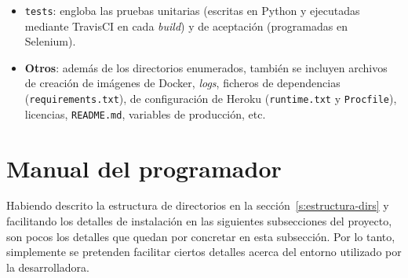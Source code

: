 \begin{itemize}
	\item \texttt{tests}: engloba las pruebas unitarias (escritas en Python y ejecutadas mediante TravisCI en cada \textit{build}) y de aceptación (programadas en Selenium).
	
	\item \textbf{Otros}: además de los directorios enumerados, también se incluyen archivos de creación de imágenes de Docker, \textit{logs}, ficheros de dependencias (\texttt{requirements.txt}), de configuración de Heroku (\texttt{runtime.txt} y \texttt{Procfile}), licencias, \texttt{README.md}, variables de producción, etc.
\end{itemize}



\section{Manual del programador}
\label{s:man-prog}

Habiendo descrito la estructura de directorios en la sección~\ref{s:estructura-dirs} y facilitando los detalles de instalación en las siguientes subsecciones del proyecto, son pocos los detalles que quedan por concretar en esta subsección. Por lo tanto, simplemente se pretenden facilitar ciertos detalles acerca del entorno utilizado por la desarrolladora.

